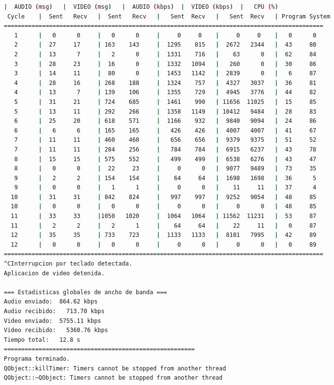 \begin{adjustbox}{max width=\textwidth}
\begin{lstlisting}[language=bash,basicstyle=\ttfamily\scriptsize]
          |  AUDIO (msg)   |  VIDEO (msg)   |  AUDIO (kbps)  |  VIDEO (kbps)  |   CPU (%)
 Cycle    |  Sent   Recv   |  Sent   Recv   |   Sent  Recv   |   Sent  Recv   | Program System
============================================================================================
   1      |   0      0     |   0      0     |     0     0    |     0     0    |   0      0
   2      |  27     17     | 163    143     |  1295    815   |  2672   2344   |  43     80
   2      |  13      7     |   2      0     |  1331    716   |    63      0   |  62     84
   3      |  28     23     |  16      0     |  1332   1094   |   260      0   |  30     86
   3      |  14     11     |  80      0     |  1453   1142   |  2839      0   |   6     87
   4      |  28     16     | 268    188     |  1324    757   |  4327   3037   |  36     81
   4      |  13      7     | 139    106     |  1355    729   |  4945   3776   |  44     82
   5      |  31     21     | 724    685     |  1461    990   | 11656  11025   |  15     85
   5      |  13     11     | 292    266     |  1358   1149   | 10412   9484   |  28     83
   6      |  25     20     | 618    571     |  1166    932   |  9840   9094   |  24     86
   6      |   6      6     | 165    165     |   426    426   |  4007   4007   |  41     67
   7      |  11     11     | 460    460     |   656    656   |  9379   9375   |  51     52
   7      |  11     11     | 284    256     |   784    784   |  6915   6237   |  43     78
   8      |  15     15     | 575    552     |   499    499   |  6538   6276   |  43     47
   8      |   0      0     |  22     23     |     0      0   |  9077   9489   |  73     35
   9      |   2      2     | 154    154     |    64     64   |  1698   1698   |  36      5
   9      |   0      0     |   1      1     |     0      0   |    11     11   |  37      4
  10      |  31     31     | 842    824     |   997    997   |  9252   9054   |  48     85
  10      |   0      0     |   0      0     |     0      0   |     0      0   |  48     85
  11      |  33     33     |1050   1020     |  1064   1064   | 11562  11231   |  53     87
  11      |   2      2     |   2      1     |    64     64   |    22     11   |   0     87
  12      |  35     35     | 733    723     |  1133   1133   |  8101   7995   |  42     89
  12      |   0      0     |   0      0     |     0      0   |     0      0   |   0     89
============================================================================================
^CInterrupcion por teclado detectada.
Aplicacion de video detenida.

=== Estadisticas globales de ancho de banda ===
Audio enviado:	864.62 kbps
Audio recibido:   713.70 kbps
Video enviado:	5755.11 kbps
Video recibido:   5360.76 kbps
Tiempo total: 	12.8 s
=======================================================
Programa terminado.
QObject::killTimer: Timers cannot be stopped from another thread
QObject::~QObject: Timers cannot be stopped from another thread
\end{lstlisting}
\end{adjustbox}
\vspace{\baselineskip}

